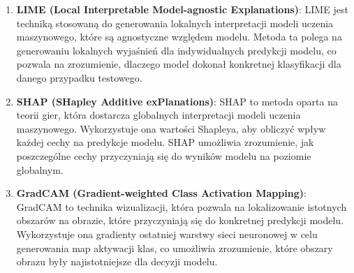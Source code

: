 \begin{enumerate}
	\item \textbf{LIME (Local Interpretable Model-agnostic Explanations)}: LIME jest techniką stosowaną do generowania lokalnych interpretacji modeli uczenia maszynowego, które są agnostyczne względem modelu.
	      Metoda ta polega na generowaniu lokalnych wyjaśnień dla indywidualnych predykcji modelu, co pozwala na zrozumienie, dlaczego model dokonał konkretnej klasyfikacji dla danego przypadku testowego.

	\item \textbf{SHAP (SHapley Additive exPlanations)}: SHAP to metoda oparta na teorii gier, która dostarcza globalnych interpretacji modeli uczenia maszynowego.
	      Wykorzystuje ona wartości Shapleya, aby obliczyć wpływ każdej cechy na predykcje modelu.
	      SHAP umożliwia zrozumienie, jak poszczególne cechy przyczyniają się do wyników modelu na poziomie globalnym.

	\item \textbf{GradCAM (Gradient-weighted Class Activation Mapping)}: GradCAM to technika wizualizacji, która pozwala na lokalizowanie istotnych obszarów na obrazie, które przyczyniają się do konkretnej predykcji modelu.
	      Wykorzystuje ona gradienty ostatniej warstwy sieci neuronowej w celu generowania map aktywacji klas, co umożliwia zrozumienie, które obszary obrazu były najistotniejsze dla decyzji modelu.
\end{enumerate}


